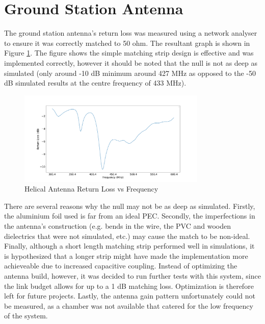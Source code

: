 \graphicspath{{./figures}}

\section{Ground Station Antenna}

The ground station antenna's return loss was measured using a network analyser to ensure it was correctly matched to 50 ohm. The resultant graph is shown in Figure \ref{fig:helicalReturnLoss}. The figure shows the simple matching strip design is effective and was implemented correctly, however it should be noted that the null is not as deep as simulated (only around -10 dB minimum around 427 MHz as opposed to the -50 dB simulated results at the centre frequency of 433 MHz).

\begin{figure}[!htb]
  \centering
  \includegraphics[width=0.8\textwidth]{helicalReturnLoss}
  \caption{Helical Antenna Return Loss vs Frequency}
  \label{fig:helicalReturnLoss}
\end{figure}

There are several reasons why the null may not be as deep as simulated. Firstly, the aluminium foil used is far from an ideal PEC. Secondly, the imperfections in the antenna's construction (e.g. bends in the wire, the PVC and wooden dielectrics that were not simulated, etc.) may cause the match to be non-ideal. Finally, although a short length matching strip performed well in simulations, it is hypothesized that a longer strip might have made the implementation more achieveable due to increased capacitive coupling. Instead of optimizing the antenna build, however, it was decided to run further tests with this system, since the link budget allows for up to a 1 dB matching loss. Optimization is therefore left for future projects. Lastly, the antenna gain pattern unfortunately could not be measured, as a chamber was not available that catered for the low frequency of the system.